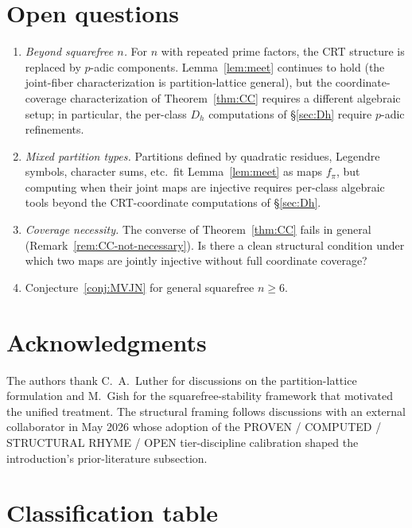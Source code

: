 \documentclass[11pt,reqno]{amsart}
\theoremstyle{plain}
\theoremstyle{definition}
\begin{document}
\section{Open questions} \label{sec:open}

\begin{enumerate}[label=(\alph*)]
\item \emph{Beyond squarefree $n$.} For $n$ with repeated prime
factors, the CRT structure is replaced by $p$-adic components.
Lemma~\ref{lem:meet} continues to hold (the joint-fiber characterization
is partition-lattice general), but the coordinate-coverage
characterization of Theorem~\ref{thm:CC} requires a different
algebraic setup; in particular, the per-class $D_h$ computations of
\S\ref{sec:Dh} require $p$-adic refinements.
\item \emph{Mixed partition types.} Partitions defined by quadratic
residues, Legendre symbols, character sums, etc.\ fit
Lemma~\ref{lem:meet} as maps $f_{\pi}$, but computing when their
joint maps are injective requires per-class algebraic tools beyond
the CRT-coordinate computations of \S\ref{sec:Dh}.
\item \emph{Coverage necessity.} The converse of Theorem~\ref{thm:CC}
fails in general (Remark~\ref{rem:CC-not-necessary}). Is there a
clean structural condition under which two maps are jointly injective
without full coordinate coverage?
\item Conjecture~\ref{conj:MVJN} for general squarefree $n \geq 6$.
\end{enumerate}

\section*{Acknowledgments}

The authors thank C.\ A.\ Luther for discussions on the
partition-lattice formulation and M.\ Gish for the squarefree-stability
framework that motivated the unified treatment. The structural
framing follows discussions with an external collaborator in May
2026 whose adoption of the PROVEN / COMPUTED / STRUCTURAL RHYME /
OPEN tier-discipline calibration shaped the introduction's
prior-literature subsection.

\section*{Classification table}
\end{document}
